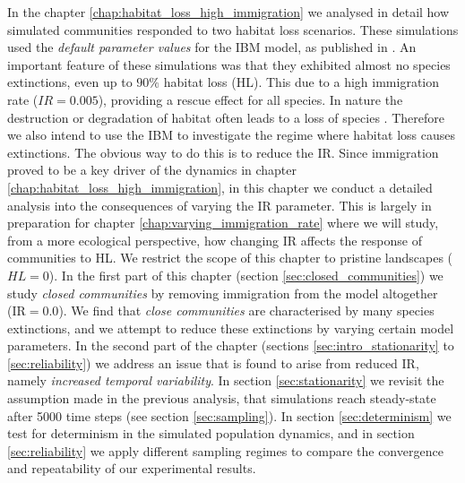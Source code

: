 In the chapter \ref{chap:habitat_loss_high_immigration} we analysed in detail how simulated communities responded to two habitat loss scenarios. These simulations used the \emph{default parameter values} for the IBM model, as published in \cite{lurgi2015effects}. An important feature of these simulations was that they exhibited almost no species extinctions, even up to $90\%$ habitat loss (HL). This due to a high immigration rate ($IR=0.005$), providing a rescue effect for all species. In nature the destruction or degradation of habitat often leads to a loss of species \cite{newbold2015global,foley2005global}. Therefore we also intend to use the IBM to investigate the regime where habitat loss causes extinctions. The obvious way to do this is to reduce the IR. Since immigration proved to be a key driver of the dynamics in chapter \ref{chap:habitat_loss_high_immigration}, in this chapter we conduct a detailed analysis into the consequences of varying the IR parameter. This is largely in preparation for chapter \ref{chap:varying_immigration_rate} where we will study, from a more ecological perspective, how changing IR affects the response of communities to HL. We restrict the scope of this chapter to pristine landscapes ($HL=0$). In the first part of this chapter (section \ref{sec:closed_communities}) we study \emph{closed communities} by removing immigration from the model altogether (IR$=0.0$). We find that \emph{close communities} are characterised by many species extinctions, and we attempt to reduce these extinctions by varying certain model parameters. In the second part of the chapter (sections \ref{sec:intro_stationarity} to \ref{sec:reliability}) we address an issue that is found to arise from reduced IR, namely \emph{increased temporal variability}. In section \ref{sec:stationarity} we revisit the assumption made in the previous analysis, that simulations reach steady-state after 5000 time steps (see section \ref{sec:sampling}). In section \ref{sec:determinism} we test for determinism in the simulated population dynamics, and in section \ref{sec:reliability} we apply different sampling regimes to compare the convergence and repeatability of our experimental results. 




